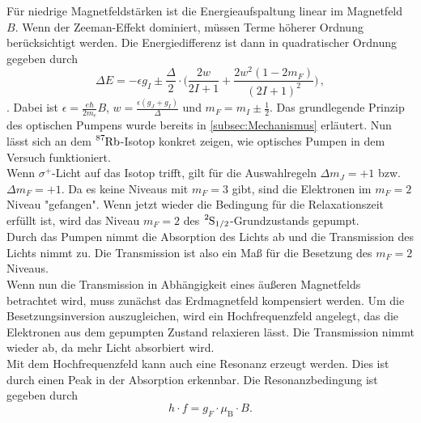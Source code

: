 Für niedrige Magnetfeldstärken ist die Energieaufspaltung linear im Magnetfeld $B$. Wenn der Zeeman-Effekt dominiert, müssen Terme höherer Ordnung berücksichtigt werden. Die Energiedifferenz ist dann
in quadratischer Ordnung gegeben durch
\begin{equation}
    \label{eqn:t1}
    \Delta E = -\epsilon g_I \pm \frac{\Delta}{2} \cdot \bigg( \frac{2w}{2I+1} + \frac{2w^2(1-2m_F)}{(2I+1)^2}\bigg) \, ,
\end{equation}
\cite{benumof}. Dabei ist $\epsilon = \frac{e\hbar}{2m_e}B$, $w = \frac{\epsilon(g_J + g_I)}{\Delta}$ und $m_F = m_I \pm \frac{1}{2}$. Das grundlegende Prinzip des optischen Pumpens wurde bereits in \autoref{subsec:Mechanismus} erläutert.
Nun lässt sich an dem $\ce{^{87}Rb}$-Isotop konkret zeigen, wie optisches Pumpen in dem Versuch funktioniert.\\
Wenn $\sigma^+$-Licht auf das Isotop trifft, gilt für die Auswahlregeln $\Delta m_J = +1$ bzw. $\Delta m_F = +1$. Da es keine Niveaus mit $m_F = 3$ gibt, sind die Elektronen im $m_F = 2$ Niveau
"gefangen". Wenn jetzt wieder die Bedingung für die Relaxationszeit erfüllt ist, wird das Niveau $m_F = 2$ des $\ce{^{2}S_{1/2}}$-Grundzustands gepumpt.\\
Durch das Pumpen nimmt die Absorption des Lichts ab und die Transmission des Lichts nimmt zu. Die Transmission ist also ein Maß für die Besetzung des $m_F = 2$ Niveaus.\\
Wenn nun die Transmission in Abhängigkeit eines äußeren Magnetfelds betrachtet wird, muss zunächst das Erdmagnetfeld kompensiert werden. 
Um die Besetzungsinversion auszugleichen, wird ein Hochfrequenzfeld angelegt, das die Elektronen aus dem gepumpten Zustand relaxieren lässt. Die Transmission nimmt wieder ab, da mehr Licht
absorbiert wird.\\
Mit dem Hochfrequenzfeld kann auch eine Resonanz erzeugt werden. Dies ist durch einen Peak in der Absorption erkennbar. Die Resonanzbedingung ist gegeben durch
\begin{equation}
    \label{eqn:t3}
    h \cdot f = g_F \cdot \mu_{\text{B}} \cdot B.
\end{equation}


\newpage
